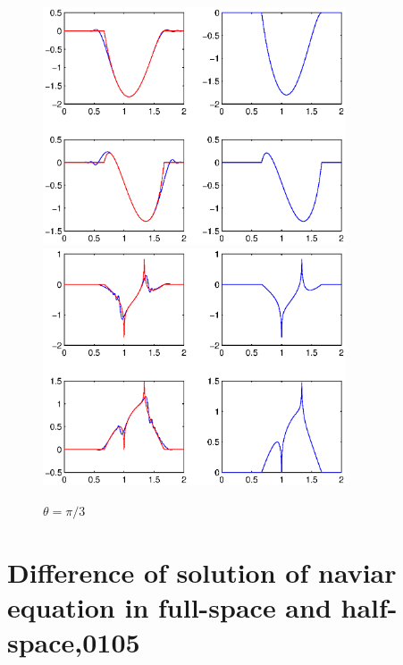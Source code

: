 \documentclass[12pt]{iopart}
\begin{document}
\begin{figure}
	\centering
	\includegraphics[width=0.8\textwidth]{./graphic/pwave_kirchhoffpi3.eps}
	\includegraphics[width=0.8\textwidth]{./graphic/swave_kirchhoffpi3.eps}	
	\caption{$\theta=\pi/3$}\label{figure_3}
\end{figure}

\section{Difference of solution of naviar equation in full-space and half-space,0105}
\end{document}
